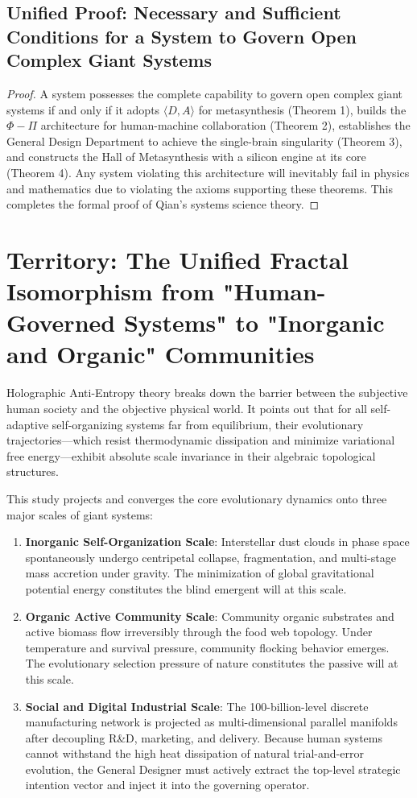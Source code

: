 \documentclass{article}
\begin{document}
\subsection*{Unified Proof: Necessary and Sufficient Conditions for a System to Govern Open Complex Giant Systems}
\begin{proof}
A system possesses the complete capability to govern open complex giant systems if and only if it adopts $\langle D, A \rangle$ for metasynthesis (Theorem 1), builds the $\Phi - \Pi$ architecture for human-machine collaboration (Theorem 2), establishes the General Design Department to achieve the single-brain singularity (Theorem 3), and constructs the Hall of Metasynthesis with a silicon engine at its core (Theorem 4). Any system violating this architecture will inevitably fail in physics and mathematics due to violating the axioms supporting these theorems.
This completes the formal proof of Qian's systems science theory.
\end{proof}

\section{Territory: The Unified Fractal Isomorphism from "Human-Governed Systems" to "Inorganic and Organic" Communities}
\label{territory}

Holographic Anti-Entropy theory breaks down the barrier between the subjective human society and the objective physical world. It points out that for all self-adaptive self-organizing systems far from equilibrium, their evolutionary trajectories---which resist thermodynamic dissipation and minimize variational free energy---exhibit absolute scale invariance in their algebraic topological structures.

This study projects and converges the core evolutionary dynamics onto three major scales of giant systems:
\begin{enumerate}
    \item \textbf{Inorganic Self-Organization Scale}: Interstellar dust clouds in phase space spontaneously undergo centripetal collapse, fragmentation, and multi-stage mass accretion under gravity. The minimization of global gravitational potential energy constitutes the blind emergent will at this scale.
    \item \textbf{Organic Active Community Scale}: Community organic substrates and active biomass flow irreversibly through the food web topology. Under temperature and survival pressure, community flocking behavior emerges. The evolutionary selection pressure of nature constitutes the passive will at this scale.
    \item \textbf{Social and Digital Industrial Scale}: The 100-billion-level discrete manufacturing network is projected as multi-dimensional parallel manifolds after decoupling R\&D, marketing, and delivery. Because human systems cannot withstand the high heat dissipation of natural trial-and-error evolution, the General Designer must actively extract the top-level strategic intention vector and inject it into the governing operator.
\end{enumerate}
\end{document}
